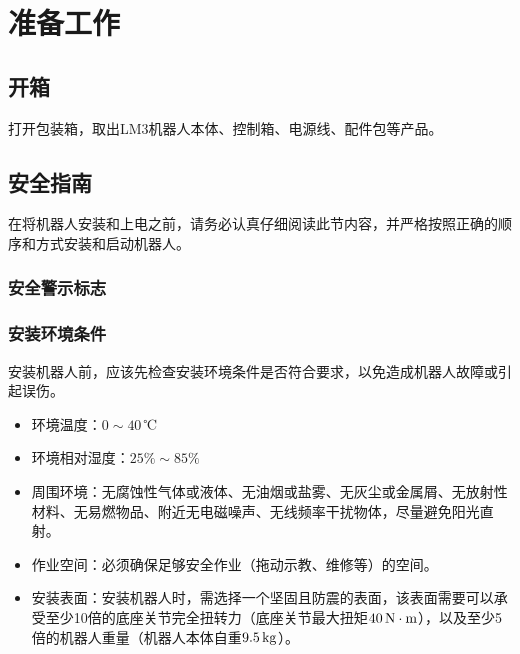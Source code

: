 \chapter{准备工作}
\section{开箱}
打开包装箱，取出LM3机器人本体、控制箱、电源线、配件包等产品。

\section{安全指南}
\label{sec:安全指南}
在将机器人安装和上电之前，请务必认真仔细阅读此节内容，并严格按照正确的顺序和方式安装和启动机器人。

\subsection{安全警示标志}




\subsection{安装环境条件}
安装机器人前，应该先检查安装环境条件是否符合要求，以免造成机器人故障或引起误伤。

\begin{itemize}
\item 环境温度：$0\sim 40\,$℃
\item 环境相对湿度：$25\%\sim 85\%$
\item 周围环境：无腐蚀性气体或液体、无油烟或盐雾、无灰尘或金属屑、无放射性材料、无易燃物品、附近无电磁噪声、无线频率干扰物体，尽量避免阳光直射。
\item 作业空间：必须确保足够安全作业（拖动示教、维修等）的空间。
\item 安装表面：安装机器人时，需选择一个坚固且防震的表面，该表面需要可以承受至少10倍的底座关节完全扭转力（底座关节最大扭矩$40 \,\mathrm{N\cdot m}$），以及至少5倍的机器人重量（机器人本体自重$9.5 \,\mathrm{kg}$）。
\end{itemize}

